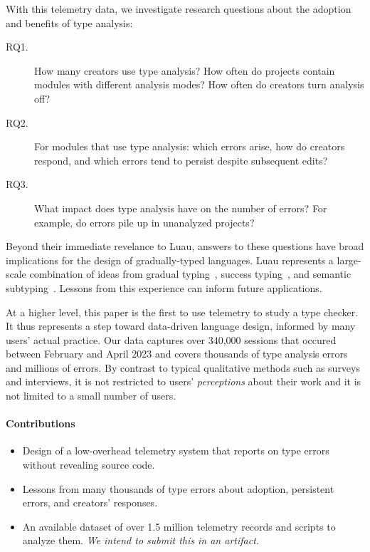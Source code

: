 \documentclass[english,submission,cleveref]{programming}
\begin{document}
With this telemetry data, we investigate research questions about
the adoption and benefits of type analysis:
\begin{description}
  \item[RQ1.]
    How many creators use type analysis?
    How often do projects contain modules with different
    analysis modes?
    How often do creators turn analysis off?
  \item[RQ2.]
    For modules that use type analysis:
    which errors arise,
    how do creators respond,
    and which errors tend to persist despite subsequent edits?
  \item[RQ3.]
    What impact does type analysis have on the number of \FS{}
    errors?
    For example, do \FS{} errors pile up in unanalyzed projects?
\end{description}

Beyond their immediate revelance to {Luau},
answers to these questions have broad implications for the design
of gradually-typed languages.
Luau represents a large-scale combination of ideas from
gradual typing~\cite{st-sfp-2006,tfffgksst-snapl-2017,bat-ecoop-2014},
success typing~\cite{lindahl2006practical},
and semantic subtyping~\cite{CF05:GentleIntroduction,Jef22:SemanticSubtyping}.
Lessons from this experience can inform future applications.

At a higher level, this paper is the first to use telemetry 
to study a type checker.
It thus represents a step toward data-driven language design,
informed by many users' actual practice.
Our data captures over 340,000 sessions
that occured between February and April 2023
and covers thousands of type analysis errors
and millions of \FS{} errors.
By contrast to typical qualitative methods such as surveys and interviews, it
is not restricted to users' \emph{perceptions} about their work and it is not
limited to a small number of users.


\paragraph{Contributions}
\begin{itemize}
  \item
    Design of a low-overhead telemetry system
    that reports on type errors without revealing source code.

  \item
    Lessons from many thousands of type errors about
    adoption, persistent errors, and creators' responses.

  \item
    An available dataset of over 1.5 million telemetry records
    and scripts to analyze them.
    \emph{We intend to submit this in an artifact.}

\end{itemize}
\end{document}
